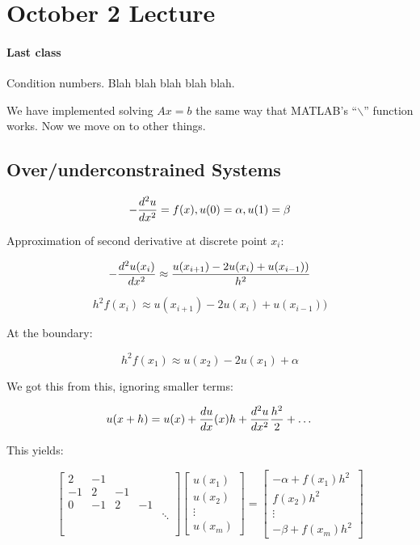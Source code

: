 \section{October 2 Lecture}

\paragraph{Last class} Condition numbers. Blah blah blah blah blah.

We have implemented solving $Ax = b$ the same way that MATLAB's ``$\backslash$'' function works. Now we move on to other things.

\subsection{Over/underconstrained Systems}

\[
	-{d^2 u \over dx^2} = f(x), u(0) = \alpha, u(1) = \beta
\]

Approximation of second derivative at discrete point $x_i$:

\[
	-{d^2 u (x_i) \over dx^2} \approx {u(x_{i+1}) - 2u(x_i)+u(x_{i-1})) \over h^2}
\]

\[
	h^2 f(x_i) \approx u(x_{i+1}) - 2u(x_i)+u(x_{i-1}))
\]

At the boundary:

\[
	h^2 f(x_1) \approx u(x_{2}) - 2u(x_1)+\alpha
\]

We got this from this, ignoring smaller terms:

\[
	u(x+h) = u(x) + {du \over dx}(x) h + {d^2u \over dx^2} {h^2 \over 2} + \dots 
\]

This yields:

\[
	\begin{bmatrix}
		2 & -1 \\
		-1 & 2 & -1 \\
		0 & -1 & 2 & -1 \\
		 & & & & \ddots \\ \\ \\
	\end{bmatrix}
	\begin{bmatrix}
		u(x_1) \\ u(x_2) \\ \vdots \\ u(x_m)
	\end{bmatrix}
	=
	\begin{bmatrix}
		-\alpha + f(x_1)h^2 \\ f(x_2)h^2\\ \vdots \\ -\beta + f(x_m)h^2
	\end{bmatrix}
\]


